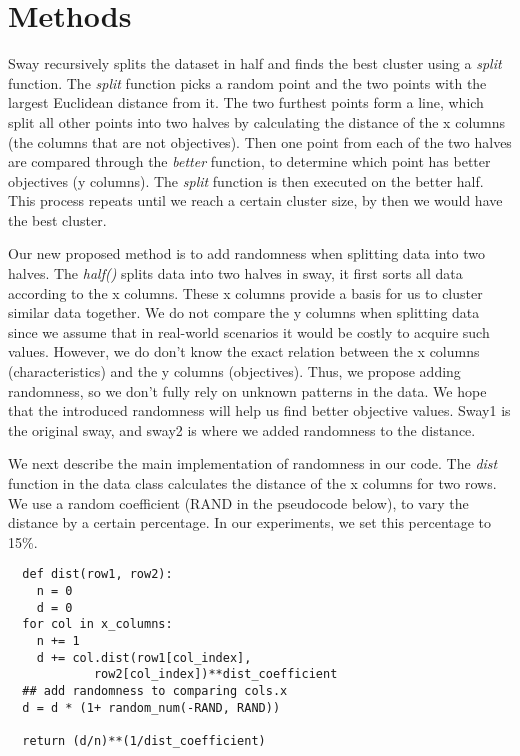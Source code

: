 \section{Methods}
\label{sec:method}



Sway recursively splits the dataset in half and finds the best cluster
using a \textit{split} function. The \textit{split} function picks a
random point and the two points with the largest Euclidean distance from
it. The two furthest points form a line, which split all other points
into two halves by calculating the distance of the x columns (the
columns that are not objectives). Then one point from each of the two
halves are compared through the \textit{better} function, to determine
which point has better objectives (y columns). The \textit{split}
function is then executed on the better half. This process repeats until
we reach a certain cluster size, by then we would have the best cluster.


Our new proposed method is to add randomness when splitting data into two
halves. The \textit{half()} splits data into two halves in sway, it
first sorts all data according to the x columns. These x columns provide
a basis for us to cluster similar data together. We do not compare the y
columns when splitting data since we assume that in real-world scenarios
it would be costly to acquire such values. However, we do don't know the
exact relation between the x columns (characteristics) and the y columns
(objectives). Thus, we propose adding randomness, so we don't fully rely
on unknown patterns in the data. We hope that the introduced randomness
will help us find better objective values. Sway1 is the original sway,
and sway2 is where we added randomness to the distance.

We next describe the main implementation of randomness in our code. The
\textit{dist} function in the data class calculates the distance of the
x columns for two rows. We use a random coefficient (RAND in the
pseudocode below), to vary the distance by a certain percentage. In our
experiments, we set this percentage to 15\%.

\begin{lstlisting}
  def dist(row1, row2):
    n = 0
    d = 0 
  for col in x_columns:
    n += 1
    d += col.dist(row1[col_index], 
            row2[col_index])**dist_coefficient
  ## add randomness to comparing cols.x
  d = d * (1+ random_num(-RAND, RAND))

  return (d/n)**(1/dist_coefficient)
\end{lstlisting}

